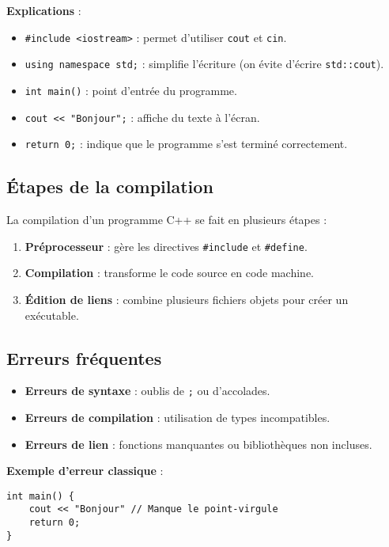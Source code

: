 \textbf{Explications} :
\begin{itemize}
    \item \texttt{\#include <iostream>} : permet d'utiliser \texttt{cout} et \texttt{cin}.
    \item \texttt{using namespace std;} : simplifie l'écriture (on évite d'écrire \texttt{std::cout}).
    \item \texttt{int main()} : point d'entrée du programme.
    \item \texttt{cout << "Bonjour";} : affiche du texte à l'écran.
    \item \texttt{return 0;} : indique que le programme s'est terminé correctement.
\end{itemize}

\subsection{ Étapes de la compilation}
La compilation d'un programme C++ se fait en plusieurs étapes :
\begin{enumerate}
    \item \textbf{Préprocesseur} : gère les directives \texttt{\#include} et \texttt{\#define}.
    \item \textbf{Compilation} : transforme le code source en code machine.
    \item \textbf{Édition de liens} : combine plusieurs fichiers objets pour créer un exécutable.
\end{enumerate}

\subsection{ Erreurs fréquentes}
\begin{itemize}
    \item \textbf{Erreurs de syntaxe} : oublis de \texttt{;} ou d'accolades.
    \item \textbf{Erreurs de compilation} : utilisation de types incompatibles.
    \item \textbf{Erreurs de lien} : fonctions manquantes ou bibliothèques non incluses.
\end{itemize}

\textbf{Exemple d'erreur classique} :
\begin{tcolorbox}[colframe=blue!50!black, colback=blue!5!white, title=Exemple d'Erreur Classique]
\begin{verbatim}
int main() {
    cout << "Bonjour" // Manque le point-virgule
    return 0;
}
\end{verbatim}
\end{tcolorbox}